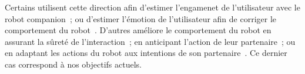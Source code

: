 \documentclass[runningheads,a4paper]{llncs}
\begin{document}
Certains utilisent cette direction afin d'estimer l'engamenet de l'utilisateur avec le robot companion~\cite{castellano2009detecting,anzalone2015evaluating,ivaldi2017towards};
ou d'estimer l'émotion de l'utilisateur afin de corriger le comportement du robot~\cite{boucenna2014robot}.
D'autres améliore le comportement du robot en assurant la sûreté de l'interaction~\cite{traver2000making};
en anticipant l'action de leur partenaire~\cite{huang2016anticipatory};
ou en adaptant les actions du robot aux intentions de son partenaire~\cite{kozima2001robot}.
Ce dernier cas correspond à nos objectifs actuels.
\end{document}
